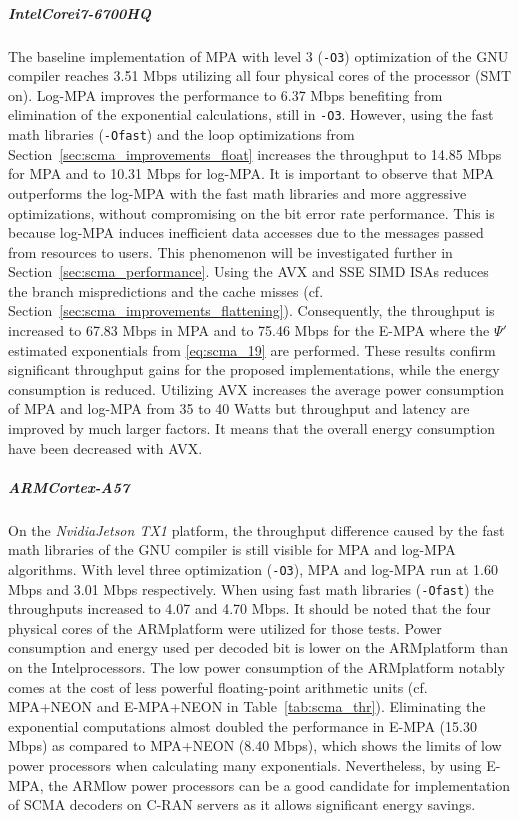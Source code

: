 \subparagraph{Intel\R Core\TM i7-6700HQ}

The baseline implementation of MPA with level 3 (\verb|-O3|) optimization of the
GNU compiler reaches 3.51 Mbps utilizing all four physical cores of the
processor (SMT on). Log-MPA improves the performance to 6.37 Mbps benefiting
from elimination of the exponential calculations, still in \verb|-O3|. However,
using the fast math libraries (\verb|-Ofast|) and the loop optimizations from
Section~\ref{sec:scma_improvements_float} increases the throughput to 14.85 Mbps
for MPA and to 10.31 Mbps for log-MPA. It is important to observe that MPA
outperforms the log-MPA with the fast math libraries and more aggressive
optimizations, without compromising on the bit error rate performance. This is
because log-MPA induces inefficient data accesses due to the messages passed
from resources to users. This phenomenon will be investigated further in
Section~\ref{sec:scma_performance}. Using the AVX and SSE SIMD ISAs reduces the
branch mispredictions and the cache misses (cf.
Section~\ref{sec:scma_improvements_flattening}). Consequently, the throughput is
increased to 67.83 Mbps in MPA and to 75.46 Mbps for the E-MPA where the $\Psi'$
estimated exponentials from \eqref{eq:scma_19} are performed. These results
confirm significant throughput gains for the proposed implementations, while the
energy consumption is reduced. Utilizing AVX increases the average power
consumption of MPA and log-MPA from 35 to 40 Watts but throughput and latency
are improved by much larger factors. It means that the overall energy
consumption have been decreased with AVX.

\subparagraph{ARM\R Cortex-A57}

On the \emph{Nvidia\R Jetson TX1} platform, the throughput difference caused by
the fast math libraries of the GNU compiler is still visible for MPA and log-MPA
algorithms. With level three optimization (\verb|-O3|), MPA and log-MPA run at
1.60 Mbps and 3.01 Mbps respectively. When using fast math libraries
(\verb|-Ofast|) the throughputs increased to 4.07 and 4.70 Mbps. It should be
noted that the four physical cores of the ARM\R platform were  utilized for
those tests. Power consumption and energy used per decoded bit is lower on the
ARM\R platform than on the Intel\R processors. The low power consumption of the
ARM\R platform notably comes at the cost of less powerful floating-point
arithmetic units (cf. MPA+NEON and E-MPA+NEON in Table~\ref{tab:scma_thr}).
Eliminating the exponential computations almost doubled the performance in E-MPA
(15.30 Mbps) as compared to MPA+NEON (8.40 Mbps), which shows the limits of low
power processors when calculating many exponentials. Nevertheless, by using
E-MPA, the ARM\R low power processors can be a good candidate for implementation
of SCMA decoders on C-RAN servers as it allows significant energy savings.


